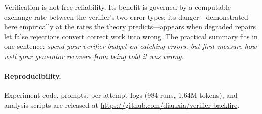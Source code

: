 \documentclass[11pt]{article}
\begin{document}
Verification is not free reliability.  Its benefit is governed by a
computable exchange rate between the verifier's two error types; its
danger---demonstrated here empirically at the rates the theory
predicts---appears when degraded repairs let false rejections
convert correct work into wrong.  The practical summary fits in one
sentence: \emph{spend your verifier budget on catching errors, but
first measure how well your generator recovers from being told it
was wrong.}

\paragraph{Reproducibility.}
Experiment code, prompts, per-attempt logs (984 runs, 1.64M tokens),
and analysis scripts are released at
\url{https://github.com/dianxia/verifier-backfire}.
\end{document}
